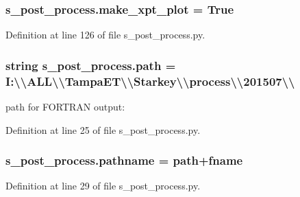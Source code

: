 \subsubsection[{make\+\_\+xpt\+\_\+plot}]{\setlength{\rightskip}{0pt plus 5cm}s\+\_\+post\+\_\+process.\+make\+\_\+xpt\+\_\+plot = True}\label{namespaces__post__process_af1070685db63f676b11421534fe570e9}


Definition at line 126 of file s\+\_\+post\+\_\+process.\+py.

\hypertarget{namespaces__post__process_a57eb09f6e1e700924ee93b619e0ee863}{}
\subsubsection[{path}]{\setlength{\rightskip}{0pt plus 5cm}string s\+\_\+post\+\_\+process.\+path = \textquotesingle{}I\+:\textbackslash{}\textbackslash{}\+A\+L\+L\textbackslash{}\textbackslash{}\+Tampa\+E\+T\textbackslash{}\textbackslash{}\+Starkey\textbackslash{}\textbackslash{}process\textbackslash{}\textbackslash{}201507\textbackslash{}\textbackslash{}\textquotesingle{}}\label{namespaces__post__process_a57eb09f6e1e700924ee93b619e0ee863}


path for F\+O\+R\+T\+R\+A\+N output\+: 



Definition at line 25 of file s\+\_\+post\+\_\+process.\+py.

\hypertarget{namespaces__post__process_a0b1be5e969443e66bb9beaa3b43cef54}{}
\subsubsection[{pathname}]{\setlength{\rightskip}{0pt plus 5cm}s\+\_\+post\+\_\+process.\+pathname = {\bf path}+{\bf fname}}\label{namespaces__post__process_a0b1be5e969443e66bb9beaa3b43cef54}


Definition at line 29 of file s\+\_\+post\+\_\+process.\+py.

\hypertarget{namespaces__post__process_a5629689e4c1b3e73d3894e6d6741d57e}{}
